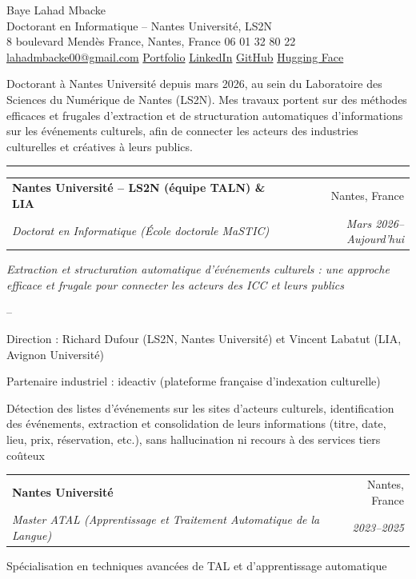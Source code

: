 \documentclass[11pt,a4paper]{article}
\makeatletter
\newcommand{\cvsection}[1]{%
  \vspace{10pt}{\Large\color{accent}#1}\par\vspace{-6pt}%
  {\color{accent}\rule{\linewidth}{0.8pt}}\par\vspace{4pt}}
\newcommand{\cventry}[4]{%
  \begin{tabularx}{\linewidth}{@{}X r@{}}
    \textbf{#1} & #2 \\
    \textit{#3} & \textit{#4}
  \end{tabularx}\par}
\newenvironment{cvitems}{%
  \begin{list}{--}{\setlength{\leftmargin}{1.5em}\setlength{\itemsep}{1pt}
  \setlength{\parsep}{0pt}\setlength{\topsep}{2pt}}}{\end{list}\vspace{4pt}}
\makeatother
\begin{document}
\begin{center}
  {\fontsize{24}{28}\selectfont\color{accent} Baye Lahad Mbacke}\\[6pt]
  Doctorant en Informatique -- Nantes Université, LS2N\\[2pt]
  8 boulevard Mendès France, Nantes, France \textbullet{} 06 01 32 80 22\\[2pt]
  \href{mailto:lahadmbacke00@gmail.com}{lahadmbacke00@gmail.com} \textbullet{}
  \href{https://lahadmbacke.github.io/Lahad_Mbacke/}{Portfolio} \textbullet{}
  \href{https://linkedin.com/in/baye-lahad-mbacke}{LinkedIn} \textbullet{}
  \href{https://github.com/LahadMbacke}{GitHub} \textbullet{}
  \href{https://huggingface.co/Lahad}{Hugging Face}
\end{center}

\vspace{4pt}
Doctorant à Nantes Université depuis mars 2026, au sein du Laboratoire des Sciences du Numérique
de Nantes (LS2N). Mes travaux portent sur des méthodes efficaces et frugales d'extraction et de
structuration automatiques d'informations sur les événements culturels, afin de connecter les
acteurs des industries culturelles et créatives à leurs publics.

\cvsection{Formation Académique}

\cventry{Nantes Université -- LS2N (équipe TALN) \& LIA}{Nantes, France}
        {Doctorat en Informatique (École doctorale MaSTIC)}{Mars 2026--Aujourd'hui}
\textit{Extraction et structuration automatique d'événements culturels : une approche efficace et
frugale pour connecter les acteurs des ICC et leurs publics}
\begin{cvitems}
  \item Direction : Richard Dufour (LS2N, Nantes Université) et Vincent Labatut (LIA, Avignon Université)
  \item Partenaire industriel : ideactiv (plateforme française d'indexation culturelle)
  \item Détection des listes d'événements sur les sites d'acteurs culturels, identification des
        événements, extraction et consolidation de leurs informations (titre, date, lieu, prix,
        réservation, etc.), sans hallucination ni recours à des services tiers coûteux
\end{cvitems}

\cventry{Nantes Université}{Nantes, France}
        {Master ATAL (Apprentissage et Traitement Automatique de la Langue)}{2023--2025}
Spécialisation en techniques avancées de TAL et d'apprentissage automatique\par\vspace{6pt}
\end{document}
